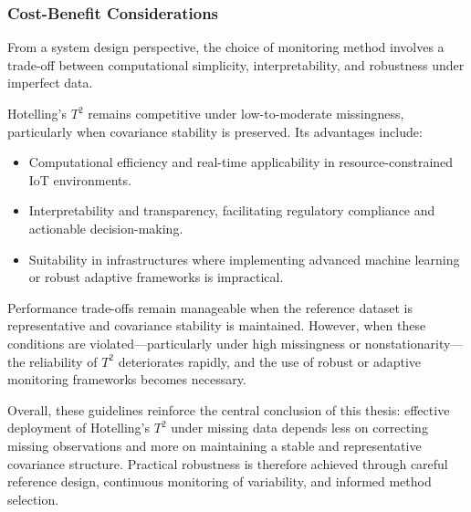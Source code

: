 \subsubsection{Cost-Benefit Considerations}

From a system design perspective, the choice of monitoring method involves a trade-off between computational simplicity, interpretability, and robustness under imperfect data.

Hotelling's $T^2$ remains competitive under low-to-moderate missingness, particularly when covariance stability is preserved. Its advantages include:

\begin{itemize}
	\item Computational efficiency and real-time applicability in resource-constrained IoT environments.
	\item Interpretability and transparency, facilitating regulatory compliance and actionable decision-making.
	\item Suitability in infrastructures where implementing advanced machine learning or robust adaptive frameworks is impractical.
\end{itemize}

Performance trade-offs remain manageable when the reference dataset is representative and covariance stability is maintained. However, when these conditions are violated—particularly under high missingness or nonstationarity—the reliability of $T^2$ deteriorates rapidly, and the use of robust or adaptive monitoring frameworks becomes necessary.

Overall, these guidelines reinforce the central conclusion of this thesis: effective deployment of Hotelling’s $T^2$ under missing data depends less on correcting missing observations and more on maintaining a stable and representative covariance structure. Practical robustness is therefore achieved through careful reference design, continuous monitoring of variability, and informed method selection.
